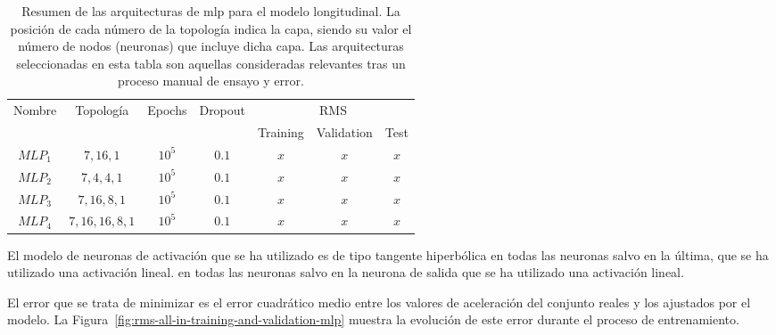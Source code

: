 \begin{table*}
	\caption[Resumen de las arquitecturas \ac{mlp} para el modelo longitudinal]{Resumen de las arquitecturas de \ac{mlp} para el modelo longitudinal. La posición de cada número de la topología indica la capa, siendo su valor el número de nodos (neuronas) que incluye dicha capa. Las arquitecturas seleccionadas en esta tabla son aquellas consideradas relevantes tras un proceso manual de ensayo y error.}
	\label{tbl:cf-mlp-architectures}
	\begin{tabular}{ccccccc}
		\hline
		\multirow{2}{*}{Nombre} & \multirow{2}{*}{Topología} & \multirow{2}{*}{Epochs} & \multirow{2}{*}{Dropout} & \multicolumn{3}{c}{RMS}      \\ \cline{5-7} 
		&                            &                         &                          & Training & Validation & Test \\ \hline
		$MLP_1$                 & $7, 16, 1$                 & $10^5$                  & $0.1$                    & $x$      & $x$        & $x$  \\
		$MLP_2$                 & $7, 4, 4, 1$               & $10^5$                  & $0.1$                    & $x$      & $x$        & $x$  \\
		$MLP_3$                 & $7, 16, 8, 1$              & $10^5$                  & $0.1$                    & $x$      & $x$        & $x$  \\
		$MLP_4$                 & $7, 16, 16, 8, 1$          & $10^5$                  & $0.1$                    & $x$      & $x$        & $x$  \\ \hline
	\end{tabular}
\end{table*}

El modelo de neuronas de activación que se ha utilizado es de tipo tangente hiperbólica en todas las neuronas salvo en la última, que se ha utilizado una activación lineal.  en todas las neuronas salvo en la neurona de salida que se ha utilizado una activación lineal.

El error que se trata de minimizar es el error cuadrático medio entre los valores de aceleración del conjunto reales y los ajustados por el modelo. La Figura~\ref{fig:rms-all-in-training-and-validation-mlp} muestra la evolución de este error durante el proceso de entrenamiento.

